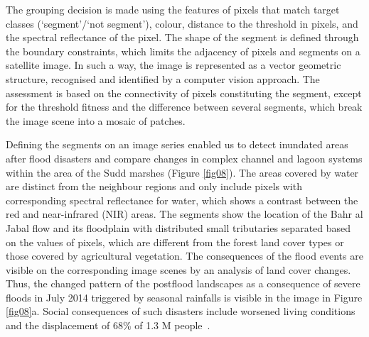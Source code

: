 \documentclass[analytics,article,accept,pdftex,moreauthors]{Definitions/mdpi}
\begin{document}
{The grouping decision}  is made using the features of  pixels that match target classes (`segment'/`not segment'), colour, distance to the threshold in pixels, and the spectral reflectance of the pixel. %
The shape of the segment is defined through the boundary constraints, which limits the adjacency of pixels and segments on a satellite image. In such a way, the image is represented as a vector geometric structure, recognised and identified by a computer vision approach. The assessment is based on the connectivity of pixels constituting the segment, except for the threshold fitness and the difference between several segments, which break the image scene into a mosaic of patches. %


{Defining} the segments on an image series enabled us to detect inundated areas after flood disasters and compare changes in complex channel and lagoon systems within the area of the Sudd marshes (Figure \ref{fig08}). The areas covered by water are distinct from the neighbour regions and only include pixels with corresponding spectral reflectance for water, which shows a contrast between the red and near-infrared (NIR) areas. The segments show the location of the Bahr al Jabal flow and its floodplain with distributed small tributaries separated based on the values of pixels, which are different from the forest land cover types or those covered by agricultural vegetation. The consequences of the flood events are visible on the corresponding image scenes by an analysis of land cover changes. Thus, the changed pattern of the postflood landscapes as a consequence of severe floods in July 2014 triggered by seasonal rainfalls is visible in the image in Figure \ref{fig08}a. Social consequences of such disasters include worsened living conditions and the displacement of 68\% of 1.3 M people~\cite{ReliefWeb2014}.  
\end{document}
